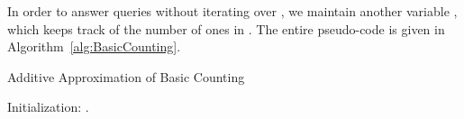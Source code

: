 In order to answer queries without iterating over , we maintain another variable , which keeps track of the number of ones in .
The entire pseudo-code is given in Algorithm~\ref{alg:BasicCounting}.

\begin{algorithm}[tb]
\caption{Additive Approximation of Basic Counting}\label{alg:BasicCounting}
\begin{algorithmic}[1]
\State Initialization: .
\If {}
	\State 
	\If {}
		\State 
		\State 
	\Else
		\State 
		\State 
	\EndIf
	\State 
	\State 
	\State 	
\Else
	\State 
	\State 
\EndIf
\EndFunction

\State \Return {}
\EndFunction
\end{algorithmic}
\end{algorithm}
%
 



